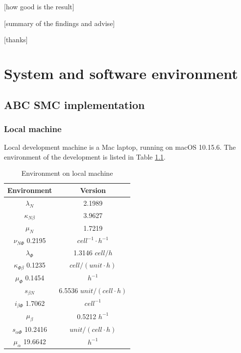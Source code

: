 \documentclass[12pt,a4paper]{report}
\begin{document}
[how good is the result]

[summary of the findings and advise]

[thanks]








\appendix

\chapter{System and software environment}

\section{ABC SMC implementation}

\subsection{Local machine}

Local development machine is a Mac laptop, running on macOS 10.15.6. The environment of the development is listed in Table \ref{table:local_macine}.

\begin{table}[h!]
    \centering
    \begin{tabular}{|c c|} 
     \hline
     Environment & Version \\ [0.5ex] 
     \hline\hline
     $\lambda_N$ & 2.1989  \\ 
     $\kappa_{N\beta}$ & 3.9627  \\
     $\mu_N$ & 1.7219 \\
     $\nu_{N\Phi}$  0.2195 & $cell^{-1}\cdotp h^{-1}$ \\
     \hline
     $\lambda_\Phi$ & 1.3146  $cell/h$ \\
     $\kappa_{\Phi\beta}$ 0.1235 & $cell/(unit\cdotp h)$ \\
     $\mu_\Phi$  0.1454 & $h^{-1}$ \\
     \hline
     $s_{\beta N}$ &6.5536  $unit/(cell\cdotp h)$ \\
     $i_{\beta\Phi}$  1.7062 & $cell^{-1}$ \\
     $\mu_\beta$ &0.5212  $h^{-1}$ \\
     \hline
     $s_{\alpha\Phi}$  10.2416 & $unit/(cell\cdotp h)$ \\
     $\mu_\alpha$ 19.6642 & $h^{-1}$ \\
    [1ex] 
     \hline
    \end{tabular}
    \caption{Environment on local machine}
    \label{table:local_macine}
\end{table}
\end{document}
